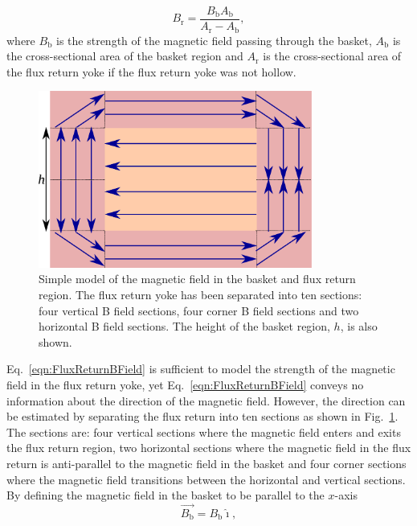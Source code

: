 \begin{equation}
  B_{\textrm{r}} = \frac{B_{\textrm{b}}A_{\textrm{b}}}{A_{\textrm{r}} - A_{\textrm{b}}},
  \label{eqn:FluxReturnBField}
\end{equation}
where $B_{\textrm{b}}$ is the strength of the magnetic field passing through the basket, $A_{\textrm{b}}$ is the cross-sectional area of the basket region and $A_{\textrm{r}}$ is the cross-sectional area of the flux return yoke if the flux return yoke was not hollow.
\newline
\newline
\begin{figure}
  \centering
  \includegraphics[width=9cm]{images/magnetic_field/BFieldDiagram}
  \caption{Simple model of the magnetic field in the basket and flux return region.  The flux return yoke has been separated into ten sections: four vertical B field sections, four corner B field sections and two horizontal B field sections.  The height of the basket region, $h$, is also shown.}
  \label{fig:BFieldDiagram}
\end{figure}
Eq.~\ref{eqn:FluxReturnBField} is sufficient to model the strength of the magnetic field in the flux return yoke, yet Eq.~\ref{eqn:FluxReturnBField} conveys no information about the direction of the magnetic field.  However, the direction can be estimated by separating the flux return into ten sections as shown in Fig.~\ref{fig:BFieldDiagram}.  The sections are: four vertical sections where the magnetic field enters and exits the flux return region, two horizontal sections where the magnetic field in the flux return is anti-parallel to the magnetic field in the basket and four corner sections where the magnetic field transitions between the horizontal and vertical sections.  By defining the magnetic field in the basket to be parallel to the $x$-axis 
\begin{equation}
  \overrightarrow{B_{\textrm{b}}} = {B_{\textrm{b}}}\hat{\imath},
  \label{eqn:BasketBFieldVector}
\end{equation}
